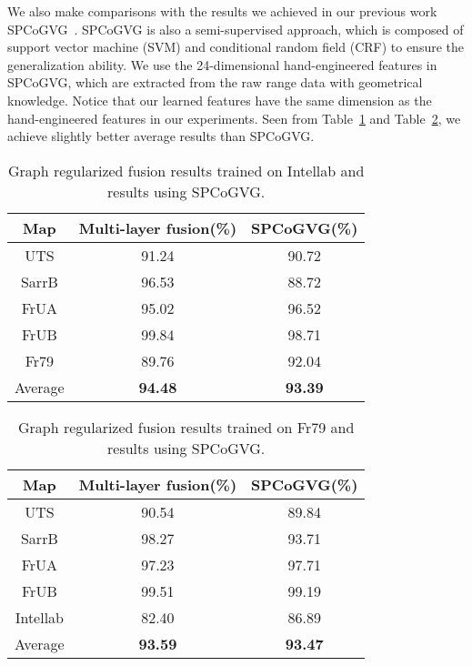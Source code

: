 \documentclass[letterpaper, 10 pt, conference]{ieeeconf}  %
\begin{document}
We also make comparisons with the results we achieved in our previous work SPCoGVG~\cite{shi2013towards}. SPCoGVG is also a semi-supervised approach, which is composed of support vector machine (SVM) and conditional random field (CRF) to ensure the generalization ability. We use the 24-dimensional hand-engineered features in SPCoGVG, which are extracted from the raw range data with geometrical knowledge. Notice that our learned features have the same dimension as the hand-engineered features in our experiments. Seen from Table~\ref{intel_fusion} and Table~\ref{fr79_fusion}, we achieve slightly better average results than SPCoGVG.
\begin{table}[tpb]
\caption{Graph regularized fusion results trained on Intellab and results using SPCoGVG.}
\label{intel_fusion}
\begin{center}
\begin{tabular}{ccc}
Map     &Multi-layer fusion(\%)     &SPCoGVG(\%)        \\
\hline
UTS     &91.24	    &90.72	    \\
SarrB   &96.53	    &88.72      \\
FrUA    &95.02	    &96.52	    \\
FrUB    &99.84	    &98.71	    \\
Fr79    &89.76	    &92.04	    \\
Average     &\textbf{94.48}	    &\textbf{93.39}	    \\
\end{tabular}
\end{center}
\end{table}

\begin{table}[tpb]
\caption{Graph regularized fusion results trained on Fr79 and results using SPCoGVG.}
\label{fr79_fusion}
\begin{center}
\begin{tabular}{ccc}
Map     &Multi-layer fusion(\%)     &SPCoGVG(\%)        \\
\hline
UTS     &90.54	    &89.84	    \\
SarrB   &98.27	    &93.71      \\
FrUA    &97.23	    &97.71	    \\
FrUB    &99.51	    &99.19	    \\
Intellab    &82.40	    &86.89	    \\
Average     &\textbf{93.59}	    &\textbf{93.47}	    \\
\end{tabular}
\end{center}
\end{table}
\end{document}
